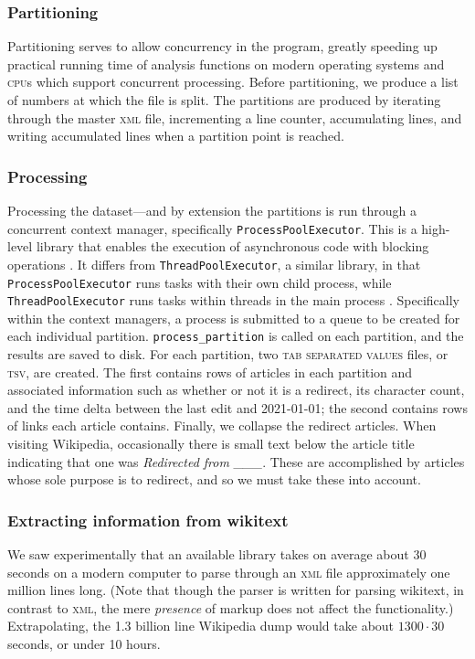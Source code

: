 \documentclass[fontsize=12pt]{article}
\newcommand{\py}[1]{\texttt{#1}}
\begin{document}
\begin{multicols}{2}
    \subsubsection{Partitioning}
    Partitioning serves to allow concurrency in the program, greatly speeding up practical running time of analysis functions on modern operating systems and \textsc{cpu}s which support concurrent processing. Before partitioning, we produce a list of numbers at which the file is split. The partitions are produced by iterating through the master \textsc{xml} file, incrementing a line counter, accumulating lines, and writing accumulated lines when a partition point is reached.

    \subsubsection{Processing}
    Processing the dataset---and by extension the partitions is run through a concurrent context manager, specifically \py{ProcessPoolExecutor}. This is a high-level library that enables the execution of asynchronous code with blocking operations \parencite{concurrent}. It differs from \py{ThreadPoolExecutor}, a similar library, in that \py{ProcessPoolExecutor} runs tasks with their own child process, while \py{ThreadPoolExecutor} runs tasks within threads in the main process \parencite{difference}. Specifically within the context managers, a process is submitted to a queue to be created for each individual partition. \py{process_partition} is called on each partition, and the results are saved to disk.
    For each partition, two \textsc{tab separated values} files, or \textsc{tsv}, are created. The first contains rows of articles in each partition and associated information such as whether or not it is a redirect, its character count, and the time delta between the last edit and 2021-01-01; the second contains rows of links each article contains. 
    Finally, we collapse the redirect articles. When visiting Wikipedia, occasionally there is small text below the article title indicating that one was \emph{Redirected from \_\_\_}. These are accomplished by articles whose sole purpose is to redirect, and so we must take these into account. 

    \subsubsection{Extracting information from wikitext}
    We saw experimentally that an available library takes on average about 30 seconds on a modern computer to parse through an \textsc{xml} file approximately one million lines long. (Note that though the parser is written for parsing wikitext, in contrast to \textsc{xml}, the mere \emph{presence} of markup does not affect the functionality.) Extrapolating, the 1.3 billion line Wikipedia dump would take about \(1300 \cdot 30\) seconds, or under 10 hours.
    

\end{multicols}
\end{document}
